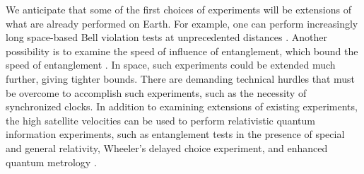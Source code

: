 \documentclass[aps,rmp,reprint,amsmath,amssymb,graphicx,longbibliography]{revtex4-1}
\begin{document}
We anticipate that some of the first choices of experiments will be extensions of what are already performed on Earth.  For example, one can perform increasingly long space-based Bell violation tests at unprecedented distances \cite{yin2017satellite}.  Another possibility is to examine the speed of influence of entanglement, which bound the speed of entanglement \cite{yin2013lower}.  In space, such experiments could be extended much further, giving tighter bounds.  There are demanding technical hurdles that must be overcome to accomplish such experiments, such as the necessity of synchronized clocks. In addition to examining extensions of existing experiments, the high satellite velocities can be used to perform relativistic quantum information experiments, such as entanglement tests in the presence of special and general relativity, Wheeler's delayed choice experiment, and enhanced quantum metrology \cite{kaltenbaek2003proof,scheidl2013quantum,ahmadi2014relativistic}.  











\end{document}
